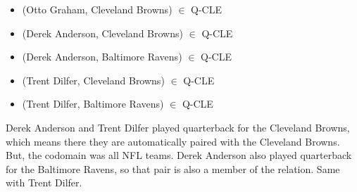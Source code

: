 \documentclass{ximera}
\begin{document}
\begin{example}
\begin{itemize}
\item (Otto Graham, Cleveland Browns) $\in$ Q-CLE
\item (Derek Anderson, Cleveland Browns) $\in$ Q-CLE
\item (Derek Anderson, Baltimore Ravens) $\in$ Q-CLE
\item (Trent Dilfer, Cleveland Browns) $\in$ Q-CLE
\item (Trent Dilfer, Baltimore Ravens) $\in$ Q-CLE
\end{itemize}

Derek Anderson and Trent Dilfer played quarterback for the Cleveland Browns, which means there they are automatically paired with the Cleveland Browns.  But, the codomain was all NFL teams.  Derek Anderson also played quarterback for the Baltimore Ravens, so that pair is also a member of the relation.  Same with Trent Dilfer.


\end{example}
\end{document}
